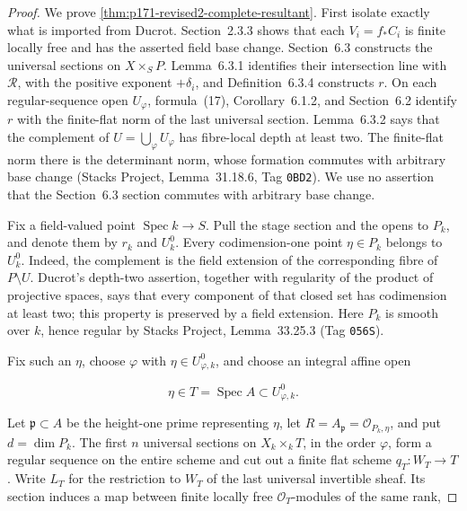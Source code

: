 
\begin{proof}
We prove \cref{thm:p171-revised2-complete-resultant}.  First isolate
exactly what is imported from Ducrot.  Section~2.3.3 shows that each
\(V_i=f_*C_i\) is finite locally free and has the asserted field base
change.  Section~6.3 constructs the universal sections on \(X\times_SP\).
Lemma~6.3.1 identifies their intersection line with \(\mathscr R\), with
the positive exponent \(+\delta_i\), and Definition~6.3.4 constructs
\(r\).  On each regular-sequence open \(U_\varphi\), formula~(17),
Corollary~6.1.2, and Section~6.2 identify \(r\) with the finite-flat norm
of the last universal section.  Lemma~6.3.2 says that the complement of
\(U=\bigcup_\varphi U_\varphi\) has fibre-local depth at least two.  The
finite-flat norm there is the determinant norm, whose formation commutes
with arbitrary base change (Stacks Project, Lemma~31.18.6,
Tag \texttt{0BD2}).  We use no assertion that the Section~6.3 section
commutes with arbitrary base change.

Fix a field-valued point \(\operatorname{Spec}k\to S\).  Pull the stage
section and the opens to \(P_k\), and denote them by \(r_k\) and
\(U_k^0\).  Every codimension-one point \(\eta\in P_k\) belongs to
\(U_k^0\).  Indeed, the complement is the field extension of the
corresponding fibre of \(P\setminus U\).  Ducrot's depth-two assertion,
together with regularity of the product of projective spaces, says that
every component of that closed set has codimension at least two; this
property is preserved by a field extension.  Here \(P_k\) is smooth over
\(k\), hence regular by Stacks Project, Lemma~33.25.3
(Tag \texttt{056S}).

Fix such an \(\eta\), choose \(\varphi\) with
\(\eta\in U_{\varphi,k}^0\), and choose an integral affine open

\[
 \eta\in T=\operatorname{Spec}A\subset U_{\varphi,k}^0.
\]

Let \(\mathfrak p\subset A\) be the height-one prime representing
\(\eta\), let \(R=A_{\mathfrak p}=\mathcal O_{P_k,\eta}\), and put
\(d=\dim P_k\).  The first \(n\) universal sections on
\(X_k\times_kT\), in the order \(\varphi\), form a regular sequence on
the entire scheme and cut out a finite flat scheme \(q_T:W_T\to T\).
Write \(L_T\) for the restriction to \(W_T\) of the last universal
invertible sheaf.  Its section induces a map between finite locally free
\(\mathcal O_T\)-modules of the same rank,


\end{proof}
